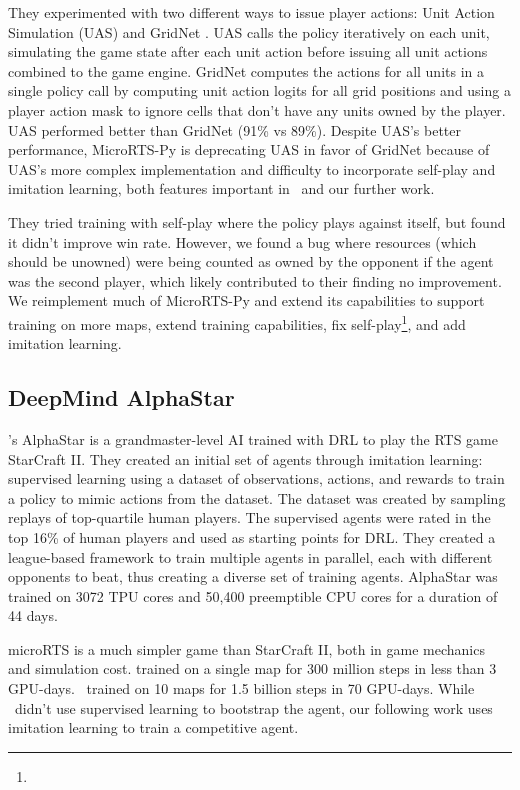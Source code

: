 \documentclass[conference]{IEEEtran}
\begin{document}
They experimented with two different ways to issue player actions: Unit Action Simulation (UAS)
and GridNet \cite{DBLP:conf/icml/HanSDXWSLZ19}. UAS calls the policy iteratively on each unit, simulating the game state
after each unit action before issuing all unit actions combined to the game engine. GridNet
computes the actions for all units in a single policy call by computing unit action
logits for all grid positions and using a player action mask to ignore cells that don't
have any units owned by the player. UAS performed better than GridNet (91\% vs 89\%).
Despite UAS's better performance, MicroRTS-Py is deprecating UAS in favor of GridNet
because of UAS's more complex implementation and difficulty to incorporate self-play and
imitation learning, both features important in \agentName\ and our further work.

They tried training with self-play where the policy plays against itself, but found it
didn't improve win rate. However, we found a bug where resources
(which should be unowned) were being counted as owned by the opponent if the agent was
the second player, which likely contributed to their finding no improvement. We reimplement much of MicroRTS-Py and extend its capabilities to support training on
more maps, extend training capabilities, fix
self-play\footnote{\unownedFixGitHubCommit}, and add imitation learning.

\subsection{DeepMind AlphaStar}
\cite{Vinyals2019GrandmasterLI}'s AlphaStar is a grandmaster-level AI trained with DRL to play the RTS game
StarCraft II. They created an initial set of agents through imitation learning: supervised learning
using a dataset of observations, actions, and rewards to train a policy to mimic actions
from the dataset. The dataset was created by sampling replays of top-quartile human
players. The supervised agents were rated in the top 16\% of human players and used as
starting points for DRL. They created a league-based framework to train multiple agents
in parallel, each with different opponents to beat, thus creating a diverse set of
training agents. AlphaStar was trained on 3072 TPU cores and 50,400 preemptible CPU
cores for a duration of 44 days.

microRTS is a much simpler game than StarCraft II, both in game mechanics and simulation
cost. \cite{DBLP:journals/corr/abs-2105-13807} trained on a single map for 300 million
steps in less than 3 GPU-days. \agentName\ trained on 10 maps for 1.5 billion steps in
70 GPU-days. While \agentName\ didn't use supervised learning to bootstrap the agent,
our following work uses imitation learning to train a competitive agent.
\end{document}
